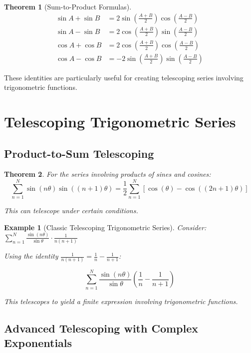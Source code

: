 \documentclass[12pt]{article}
\newtheorem{theorem}{Theorem}
\newtheorem{example}{Example}
\begin{document}
\begin{theorem}[Sum-to-Product Formulas]
\begin{align}
\sin A + \sin B &= 2\sin\left(\frac{A+B}{2}\right)\cos\left(\frac{A-B}{2}\right) \\
\sin A - \sin B &= 2\cos\left(\frac{A+B}{2}\right)\sin\left(\frac{A-B}{2}\right) \\
\cos A + \cos B &= 2\cos\left(\frac{A+B}{2}\right)\cos\left(\frac{A-B}{2}\right) \\
\cos A - \cos B &= -2\sin\left(\frac{A+B}{2}\right)\sin\left(\frac{A-B}{2}\right)
\end{align}
\end{theorem}

These identities are particularly useful for creating telescoping series involving trigonometric functions.

\section{Telescoping Trigonometric Series}

\subsection{Product-to-Sum Telescoping}

\begin{theorem}
For the series involving products of sines and cosines:
$$\sum_{n=1}^{N} \sin(n\theta)\sin((n+1)\theta) = \frac{1}{2}\sum_{n=1}^{N} [\cos(\theta) - \cos((2n+1)\theta)]$$

This can telescope under certain conditions.
\end{theorem}

\begin{example}[Classic Telescoping Trigonometric Series]
Consider: $\sum_{n=1}^{N} \frac{\sin(n\theta)}{\sin\theta} \cdot \frac{1}{n(n+1)}$

Using the identity $\frac{1}{n(n+1)} = \frac{1}{n} - \frac{1}{n+1}$:

$$\sum_{n=1}^{N} \frac{\sin(n\theta)}{\sin\theta} (\frac{1}{n} - \frac{1}{n+1})$$

This telescopes to yield a finite expression involving trigonometric functions.
\end{example}

\subsection{Advanced Telescoping with Complex Exponentials}
\end{document}
